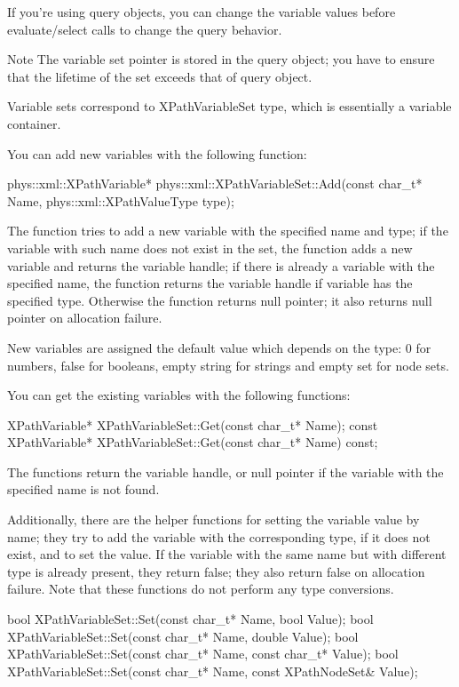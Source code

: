  If you're using query objects, you can change the variable values before evaluate/select calls to change the query behavior. \begin{DoxyNote}{Note}
The variable set pointer is stored in the query object; you have to ensure that the lifetime of the set exceeds that of query object.
\end{DoxyNote}
Variable sets correspond to XPathVariableSet type, which is essentially a variable container. \par
 \par
 You can add new variables with the following function: 
\begin{DoxyCode}
 phys::xml::XPathVariable* phys::xml::XPathVariableSet::Add(const char_t* Name, 
      phys::xml::XPathValueType type);
\end{DoxyCode}
 The function tries to add a new variable with the specified name and type; if the variable with such name does not exist in the set, the function adds a new variable and returns the variable handle; if there is already a variable with the specified name, the function returns the variable handle if variable has the specified type. Otherwise the function returns null pointer; it also returns null pointer on allocation failure. \par
 \par
 New variables are assigned the default value which depends on the type: 0 for numbers, false for booleans, empty string for strings and empty set for node sets. \par
 \par
 You can get the existing variables with the following functions: 
\begin{DoxyCode}
 XPathVariable* XPathVariableSet::Get(const char_t* Name);
 const XPathVariable* XPathVariableSet::Get(const char_t* Name) const;
\end{DoxyCode}
 The functions return the variable handle, or null pointer if the variable with the specified name is not found. \par
 \par
 Additionally, there are the helper functions for setting the variable value by name; they try to add the variable with the corresponding type, if it does not exist, and to set the value. If the variable with the same name but with different type is already present, they return false; they also return false on allocation failure. Note that these functions do not perform any type conversions. 
\begin{DoxyCode}
 bool XPathVariableSet::Set(const char_t* Name, bool Value);
 bool XPathVariableSet::Set(const char_t* Name, double Value);
 bool XPathVariableSet::Set(const char_t* Name, const char_t* Value);
 bool XPathVariableSet::Set(const char_t* Name, const XPathNodeSet& Value);
\end{DoxyCode}
